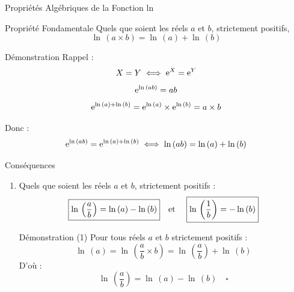 \documentclass{coursbook}
\begin{document}
    \pagebreak
    \begin{Gpartie}{Propriétés Algébriques de la Fonction ln}
        \begin{Spartie}{Propriété Fondamentale}
            Quels que soient les réels $a$ et $b$, strictement positifs, 
            \[\boxed{\ln\,(a\times b)=\ln\,(a)+\ln\,(b)}\]
            \begin{SSpartie}{Démonstration}
                Rappel : \[X=Y\iff \mathrm{e}^X=\mathrm{e}^Y\]
                \[\mathrm{e}^{\ln\,(ab)}=ab\]
                \[\mathrm{e}^{\ln\,(a)+\ln\,(b)}=\mathrm{e}^{\ln\,(a)}\times \mathrm{e}^{\ln\,(b)}=a\times b\]

                Donc : \[\mathrm{e}^{\ln\,(ab)}=\mathrm{e}^{\ln\,(a)+\ln\,(b)}\iff\ln\,(ab)=\ln\,(a)+\ln\,(b)\]
            \end{SSpartie}
        \end{Spartie}
        \begin{Spartie}{Conséquences}
            \begin{enumerate}[(1)]
                \item Quels que soient les réels $a$ et $b$, strictement positifs :
                \[\boxed{\ln\,\left(\frac{a}{b}\right)=\ln\,(a)-\ln\,(b)}\text{\quad et \quad}\boxed{\ln\,\left(\frac{1}{b}\right)=-\ln\,(b)}\]
                \begin{SSpartie}{Démonstration (1)} 
                    Pour tous réels $a$ et $b$ strictement positifs : \[\ln\,(a)=\ln\,\left(\frac{a}{b}\times b\right)=\ln\,\left(\frac{a}{b}\right)+\ln\,(b)\]
                    D'où : \[\ln\,\left(\frac{a}{b}\right)=\ln\,(a)-\ln\,(b)\quad\square\]


\end{SSpartie}
\end{enumerate}
\end{Spartie}
\end{Gpartie}
\end{document}
